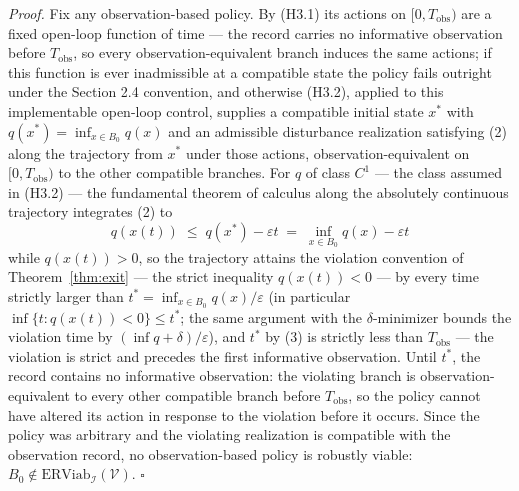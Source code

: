 \documentclass[11pt]{article}
\theoremstyle{definition}
\begin{document}
\emph{Proof.} Fix any observation-based policy. By (H3.1) its actions on
\([0, T_{\mathrm{obs}})\) are a fixed open-loop function of time --- the record carries no
informative observation before \(T_{\mathrm{obs}}\), so every
observation-equivalent branch induces the same actions; if this function
is ever inadmissible at a compatible state the policy fails outright
under the Section 2.4 convention, and otherwise (H3.2), applied to this
implementable open-loop control, supplies a compatible initial
state \(x^*\) with \(q(x^*) = \inf_{x \in B_0} q(x)\) and an admissible
disturbance realization satisfying (2) along the trajectory from \(x^*\)
under those actions, observation-equivalent on \([0, T_{\mathrm{obs}})\)
to the other compatible branches. For \(q\) of class \(C^1\) --- the
class assumed in (H3.2) --- the fundamental theorem of calculus along
the absolutely continuous trajectory integrates (2) to
\[q(x(t)) \;\le\; q(x^*) - \varepsilon t \;=\; \inf_{x \in B_0} q(x) - \varepsilon t\]
while \(q(x(t)) > 0\), so the trajectory attains the violation
convention of Theorem~\ref{thm:exit} --- the strict inequality \(q(x(t)) < 0\) --- by
every time strictly larger than
\(t^* = \inf_{x \in B_0} q(x) / \varepsilon\) (in particular
\(\inf\{ t : q(x(t)) < 0 \} \le t^*\); the same argument with the
\(\delta\)-minimizer bounds the violation time by
\((\inf q + \delta)/\varepsilon\)), and \(t^*\) by (3) is strictly less
than \(T_{\mathrm{obs}}\) --- the violation is strict and precedes the
first informative observation. Until \(t^*\), the record contains no
informative observation: the violating branch is observation-equivalent
to every other compatible branch before \(T_{\mathrm{obs}}\), so the
policy cannot have altered its action in response to the violation
before it occurs. Since the policy was arbitrary and the violating
realization is compatible with the observation record, no
observation-based policy is robustly viable:
\(B_0 \notin \mathrm{ERViab}_{\mathcal{I}}(\mathcal{V})\). \ensuremath{\square}
\end{document}
